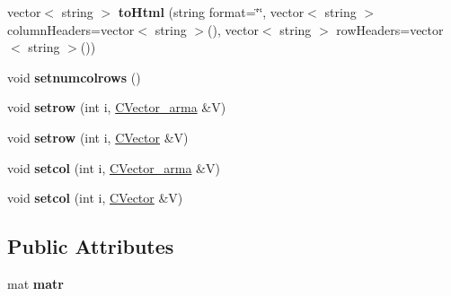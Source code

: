 \begin{DoxyCompactItemize}
vector$<$ string $>$ {\bfseries to\+Html} (string format=\char`\"{}\char`\"{}, vector$<$ string $>$ column\+Headers=vector$<$ string $>$(), vector$<$ string $>$ row\+Headers=vector$<$ string $>$())
\item 
\mbox{\label{class_c_matrix__arma_a3410a52163a258f80951375677888dad}} 
void {\bfseries setnumcolrows} ()
\item 
\mbox{\label{class_c_matrix__arma_aff45fd6ffebbeba55b55f8bfb514c929}} 
void {\bfseries setrow} (int i, \hyperlink{class_c_vector__arma}{C\+Vector\+\_\+arma} \&V)
\item 
\mbox{\label{class_c_matrix__arma_a09e2a47236ae31830a0978c56f84a28f}} 
void {\bfseries setrow} (int i, \hyperlink{class_c_vector}{C\+Vector} \&V)
\item 
\mbox{\label{class_c_matrix__arma_a962088d30e001e7141c49a476fd8bb11}} 
void {\bfseries setcol} (int i, \hyperlink{class_c_vector__arma}{C\+Vector\+\_\+arma} \&V)
\item 
\mbox{\label{class_c_matrix__arma_a8c1968c25f87c01d41f62b563e5c10a1}} 
void {\bfseries setcol} (int i, \hyperlink{class_c_vector}{C\+Vector} \&V)
\end{DoxyCompactItemize}
\subsection*{Public Attributes}
\begin{DoxyCompactItemize}
\item 
\mbox{\label{class_c_matrix__arma_a0bfe3b708449a1be86b31da63f002f9f}} 
mat {\bfseries matr}
\end{DoxyCompactItemize}
